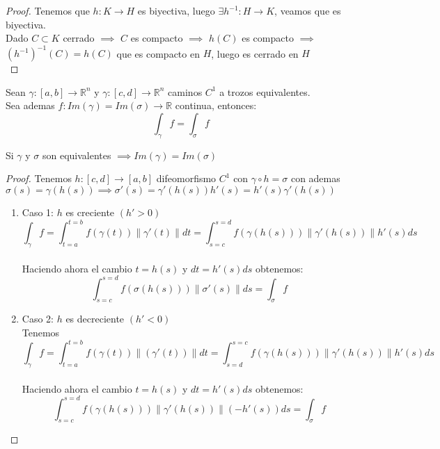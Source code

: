 \begin{proof}
    Tenemos que $h:K \to H$ es biyectiva, luego $\exists h^{-1}:H \to K$, veamos que es biyectiva. \\
    Dado $C \subset K$ cerrado $\implies$ $C$ es compacto $\implies$ $h(C)$ es compacto $\implies$ $(h^{-1})^{-1}(C)=h(C)$ que es compacto en $H$, luego es cerrado en $H$ \\
\end{proof}

\begin{teorema}
    Sean $\gamma: [a,b] \to \mathbb{R}^n$ y $\gamma:[c,d] \to \mathbb{R}^n$ caminos $C^1$ a trozos equivalentes. \\
    Sea ademas $f:Im(\gamma)=Im(\sigma) \to \mathbb{R}$ continua, entonces: \\
    $$\int_{\gamma}f=\int_{\sigma}f$$
\end{teorema}

\begin{observación}
Si $\gamma$ y $\sigma$ son equivalentes $\implies Im(\gamma)=Im(\sigma)$
\end{observación}

\begin{proof}
    Tenemos $h:[c,d] \to [a,b]$ difeomorfismo $C^1$ con $\gamma \circ h = \sigma$ con ademas $\sigma(s) = \gamma(h(s)) \implies \sigma'(s) = \gamma'(h(s))h'(s)=h'(s)\gamma'(h(s))$ \\
    \begin{enumerate}
        \item Caso 1: $h$ es creciente $(h'>0)$ \\ $$\int_{\gamma} f = \int_{t=a}^{t=b}
                  f(\gamma(t)) \lVert \gamma'(t) \rVert dt = \int_{s=c}^{s=d} f(\gamma(h(s)))
                  \lVert \gamma'(h(s)) \rVert h'(s)ds$$ \\ Haciendo ahora el cambio $t=h(s)$ y
              $dt=h'(s)ds$ obtenemos: $$\int_{s=c}^{s=d} f(\sigma(h(s))) \lVert \sigma'(s)
                  \rVert ds=\int_{\sigma}f$$
        \item Caso 2: $h$ es decreciente $(h'<0)$\\ Tenemos $$ \int_{\gamma} f=
                  \int_{t=a}^{t=b} f(\gamma(t)) \lVert (\gamma'(t)) \rVert
                  dt=\int_{s=d}^{s=c}f(\gamma(h(s))) \lVert \gamma'(h(s)) \rVert h'(s)ds$$ \\
              Haciendo ahora el cambio $t=h(s)$ y $dt=h'(s)ds$ obtenemos: $$\int_{s=c}^{s=d}
                  f(\gamma(h(s))) \lVert \gamma'(h(s)) \rVert (-h'(s))ds = \int_{\sigma}f$$
    \end{enumerate}
\end{proof}

